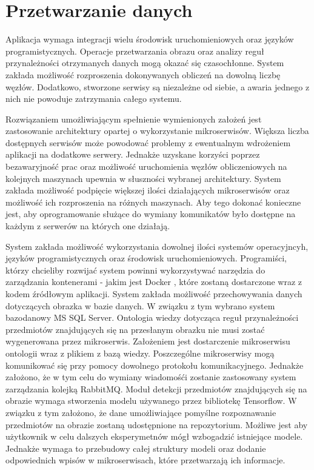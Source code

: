 \section{Przetwarzanie danych}{
Aplikacja wymaga integracji wielu środowisk uruchomieniowych oraz języków programistycznych. Operacje przetwarzania obrazu oraz analizy reguł przynależności otrzymanych danych mogą okazać się czasochłonne. System zakłada możliwość rozproszenia dokonywanych obliczeń na dowolną liczbę węzłów. Dodatkowo, stworzone serwisy są niezależne od siebie, a awaria jednego z nich nie powoduje zatrzymania całego systemu. 

Rozwiązaniem umożliwiającym spełnienie wymienionych założeń jest zastosowanie architektury opartej o wykorzystanie mikroserwisów. Większa liczba dostępnych serwisów może powodować problemy z ewentualnym wdrożeniem aplikacji na dodatkowe serwery. Jednakże uzyskane korzyści poprzez bezawaryjność prac oraz możliwość uruchomienia węzłów obliczeniowych na kolejnych maszynach upewnia w słuszności wybranej architektury. System zakłada możliwość podpięcie większej ilości działających mikroserwisów oraz możliwość ich rozproszenia na różnych maszynach. Aby tego dokonać konieczne jest, aby oprogramowanie służące do wymiany komunikatów było dostępne na każdym z serwerów na których one działają.

System zakłada możliwość wykorzystania dowolnej ilości systemów operacyjncyh, języków programistycznych oraz środowisk uruchomieniowych. Programiści, którzy chcieliby rozwijać system powinni wykorzystywać narzędzia do zarządzania kontenerami - jakim jest Docker \cite{Docker}, które zostaną dostarczone wraz z kodem źródłowym aplikacji. System zakłada możliwość przechowywania danych dotyczących obrazka w bazie danych. W związku z tym wybrano system bazodanowy MS SQL Server. Ontologia wiedzy dotycząca reguł przynależności przedmiotów znajdujących się na przesłanym obrazku nie musi zostać wygenerowana przez mikroserwis. Założeniem jest dostarczenie mikroserwisu ontologii wraz z plikiem z bazą wiedzy. Poszczególne mikroserwisy mogą komunikować się przy pomocy dowolnego protokołu komunikacyjnego. Jednakże założono, że w tym celu do wymiany wiadomośći zostanie zastosowany system zarządzania kolejką RabbitMQ. Moduł detekcji przedmiotów znajdujących się na obrazie wymaga stworzenia modelu używanego przez bibliotekę Tensorflow. W związku z tym założono, że dane umożliwiające pomyślne rozpoznawanie przedmiotów na obrazie zostaną udostępnione na repozytorium. Możliwe jest aby użytkownik w celu dalszych eksperymetnów mógł wzbogadzić istniejące modele. Jednakże wymaga to przebudowy całej struktury modeli oraz dodanie odpowiednich wpisów w mikroserwisach, które przetwarzają ich informacje.
}

